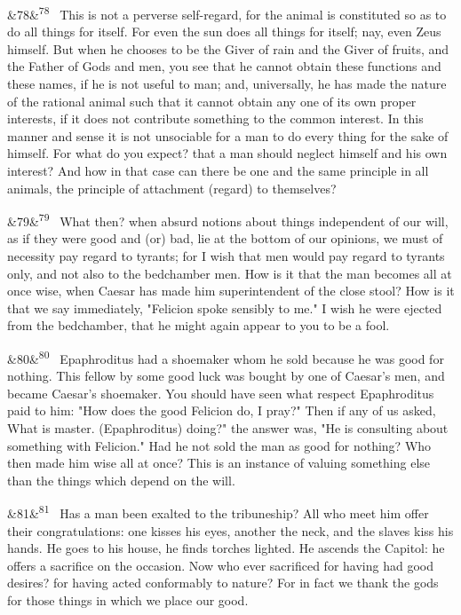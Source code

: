 \documentclass[12pt]{article}
\newcommand{\para}[1][]{\par\noindent\ifx&#1&\else\textsuperscript{\footnotesize #1}~\fi}
\begin{document}
\para[78] This is not a perverse self-regard, for the animal is constituted so as to do all things for itself. For even the sun does all things for itself; nay, even Zeus himself. But when he chooses to be the Giver of rain and the Giver of fruits, and the Father of Gods and men, you see that he cannot obtain these functions and these names, if he is not useful to man; and, universally, he has made the nature of the rational animal such that it cannot obtain any one of its own proper interests, if it does not contribute something to the common interest. In this manner and sense it is not unsociable for a man to do every thing for the sake of himself. For what do you expect? that a man should neglect himself and his own interest? And how in that case can there be one and the same principle in all animals, the principle of attachment (regard) to themselves?

\para[79] What then? when absurd notions about things independent of our will, as if they were good and (or) bad, lie at the bottom of our opinions, we must of necessity pay regard to tyrants; for I wish that men would pay regard to tyrants only, and not also to the bedchamber men. How is it that the man becomes all at once wise, when Caesar has made him superintendent of the close stool? How is it that we say immediately, "Felicion spoke sensibly to me." I wish he were ejected from the bedchamber, that he might again appear to you to be a fool.

\para[80] Epaphroditus had a shoemaker whom he sold because he was good for nothing. This fellow by some good luck was bought by one of Caesar's men, and became Caesar's shoemaker. You should have seen what respect Epaphroditus paid to him: "How does the good Felicion do, I pray?" Then if any of us asked, What is master. (Epaphroditus) doing?" the answer was, "He is consulting about something with Felicion." Had he not sold the man as good for nothing? Who then made him wise all at once? This is an instance of valuing something else than the things which depend on the will.

\para[81] Has a man been exalted to the tribuneship? All who meet him offer their congratulations: one kisses his eyes, another the neck, and the slaves kiss his hands. He goes to his house, he finds torches lighted. He ascends the Capitol: he offers a sacrifice on the occasion. Now who ever sacrificed for having had good desires? for having acted conformably to nature? For in fact we thank the gods for those things in which we place our good.
\end{document}
